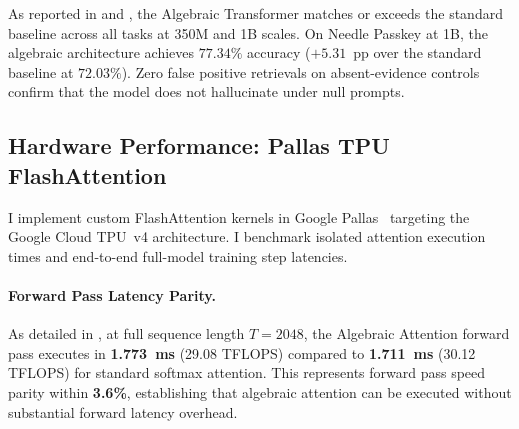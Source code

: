 \documentclass[11pt,a4paper]{article}
\theoremstyle{definition}
\begin{document}
As reported in  and , the Algebraic Transformer matches or exceeds the standard baseline across all tasks at 350M and 1B scales. On Needle Passkey at 1B, the algebraic architecture achieves $\mathbf{77.34\%}$ accuracy ($+5.31$~pp over the standard baseline at $72.03\%$). Zero false positive retrievals on absent-evidence controls confirm that the model does not hallucinate under null prompts.

\subsection{Hardware Performance: Pallas TPU FlashAttention}
\label{subsec:hardware}

I implement custom FlashAttention kernels in Google Pallas~\citep{jouppi2023tpu4} targeting the Google Cloud TPU~v4 architecture. I benchmark isolated attention execution times and end-to-end full-model training step latencies.

\begin{table}[t]
\centering
\caption{\textbf{Cloud TPU~v4 FlashAttention Execution Latency and Throughput.} Benchmarked across sequence lengths $T$ on a single TPU~v4 chip ($B=8, H=12, d_h=64$).}
\label{tab:hardware}
\end{table}

\paragraph{Forward Pass Latency Parity.}
As detailed in , at full sequence length $T=2048$, the Algebraic Attention forward pass executes in \textbf{1.773~ms} (29.08 TFLOPS) compared to \textbf{1.711~ms} (30.12 TFLOPS) for standard softmax attention. This represents forward pass speed parity within \textbf{3.6\%}, establishing that algebraic attention can be executed without substantial forward latency overhead.
\end{document}
